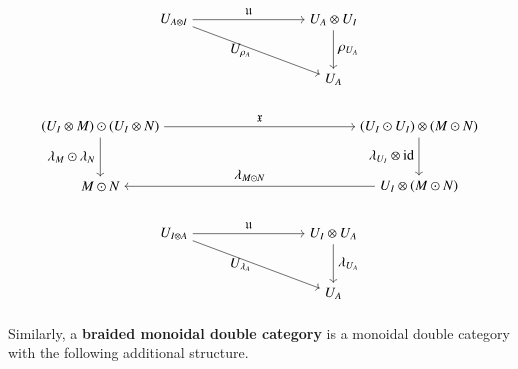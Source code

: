 \begin{enumerate}
      \begin{equation}\label{eq:mondoub7}
\begin{aligned}
\begin{tikzpicture}[yscale=1.5]
\node (tl) at (0,2) {$U_{A\tens I}$};
\node (tr) at (4,2) {$U_A \tens  U_I$};
\node (mr) at (4,1) {$U_A$};
\draw[->] (tl) to node[above]{$\fu$} (tr);
\draw[->] (tl) to node[left]{$U_{\rho_A}$} (mr);
\draw[->] (tr) to node[right]{$\rho_{U_A}$} (mr);
\end{tikzpicture}
    \end{aligned}
\end{equation}

 \begin{equation}\label{eq:mondoub8}
\begin{aligned}
\begin{tikzpicture}[xscale=2, yscale=1.5]
\node (tl) at (0,2) {$(U_I \tens M) \odot ( U_I \tens N) $};
\node (tr) at (4,2) {$( U_I \odot U_I) \tens (M \odot N) $};
\node (ml) at (0,1) {$M \odot N$};
\node (mr) at (4,1) {$U_I \tens (M \odot N) $};
\draw[->] (tl) to node[above] {$\fx$} (tr);
\draw[->] (tl) to node[left]{$\lambda_M \odot \lambda_N$} (ml);
\draw[->] (tr) to node[left]{$\lambda_{U_I} \tens \id$} (mr);
\draw[->] (mr) to node[above] {$\lambda_{M \odot N}$} (ml);
\end{tikzpicture}
    \end{aligned}
\end{equation}
      
      \begin{equation}\label{eq:mondoub9}
\begin{aligned}
\begin{tikzpicture}[yscale=1.5]
\node (tl) at (0,2) {$U_{I\tens A}$};
\node (tr) at (4,2) {$U_I \tens  U_A$};
\node (mr) at (4,1) {$U_A$};
\draw[->] (tl) to node[above]{$\fu$} (tr);
\draw[->] (tl) to node[left]{$U_{\lambda_A}$} (mr);
\draw[->] (tr) to node[right]{$\lambda_{U_A}$} (mr);
\end{tikzpicture}
    \end{aligned}
\end{equation}

  \setcounter{mondbl}{\value{enumi}}
\end{enumerate}
Similarly, a \textbf{braided monoidal double category} is a monoidal double
category with the following additional structure.
